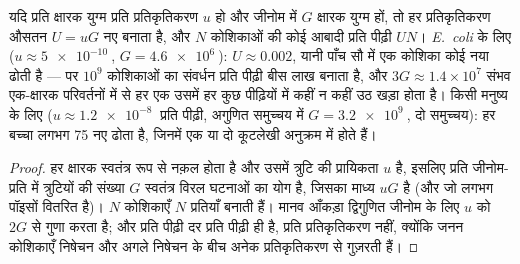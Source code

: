 \begin{theorem}[प्रति जीनोम और प्रति आबादी उत्परिवर्तन]\label{thm:b2:genome-diversification:rate}
यदि  प्रति क्षारक युग्म प्रति प्रतिकृतिकरण $u$ हो और
जीनोम में $G$ क्षारक युग्म हों, तो हर प्रतिकृतिकरण औसतन
$U = uG$ नए  बनाता है, और $N$ कोशिकाओं की कोई आबादी प्रति
पीढ़ी $UN$। \emph{E.~coli} के लिए ($u \approx \qty{5e-10}{}$, $G =
\qty{4.6e6}{}$): $U \approx 0.002$, यानी पाँच सौ में एक कोशिका कोई नया
 ढोती है --- पर $10^{9}$ कोशिकाओं का संवर्धन प्रति पीढ़ी
बीस लाख बनाता है, और $3G \approx 1.4\times
10^{7}$ संभव एक-क्षारक परिवर्तनों में से हर एक उसमें हर कुछ पीढ़ियों
में कहीं न कहीं उठ खड़ा होता है। किसी मनुष्य के लिए ($u \approx \qty{1.2e-8}{}$ प्रति
पीढ़ी, अगुणित समुच्चय में $G = \qty{3.2e9}{}$, दो समुच्चय): हर
बच्चा लगभग \num{75} नए  ढोता है, जिनमें एक या दो
कूटलेखी अनुक्रम में होते हैं।
\end{theorem}
\begin{proof}
हर क्षारक स्वतंत्र रूप से नक़ल होता है और उसमें त्रुटि की प्रायिकता $u$
है, इसलिए प्रति जीनोम-प्रति में त्रुटियों की संख्या $G$ स्वतंत्र विरल
घटनाओं का योग है, जिसका माध्य $uG$ है (और जो लगभग पॉइसों वितरित है)।
$N$ कोशिकाएँ $N$ प्रतियाँ बनाती हैं। मानव आँकड़ा द्विगुणित जीनोम के लिए
$u$ को $2G$ से गुणा करता है; और प्रति पीढ़ी दर प्रति पीढ़ी ही है, प्रति
प्रतिकृतिकरण नहीं, क्योंकि जनन कोशिकाएँ निषेचन और अगले निषेचन के बीच
अनेक प्रतिकृतिकरण से गुज़रती हैं।
\end{proof}

